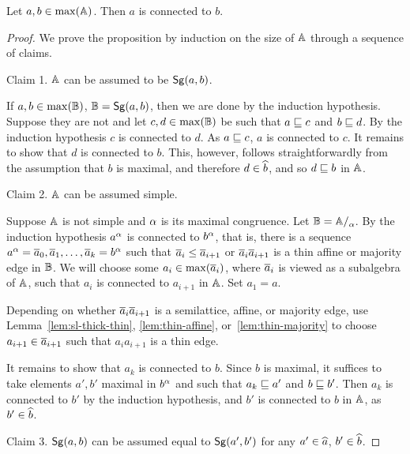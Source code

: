 \documentclass[11pt]{article}
\begin{document}
\begin{prop}\label{pro:as-connectivity}
Let $a,b\in\max({\mathbb A})$. Then $a$ is connected to $b$.
\end{prop}

\begin{proof}
We prove the proposition by induction on the size of ${\mathbb A}$ through a sequence of claims.

\smallskip

{\sc Claim 1.}
${\mathbb A}$ can be assumed to be ${\sf Sg}(a,b)$.

\smallskip

If $a,b\in\max({\mathbb B})$, ${\mathbb B}={\sf Sg}(a,b)$, then we are done by the induction hypothesis. 
Suppose they are not and let $c,d\in\max({\mathbb B})$ be such that $a\sqsubseteq c$ and $b\sqsubseteq d$. 
By the induction hypothesis $c$ is connected to $d$. 
As $a\sqsubseteq c$, $a$ is connected to $c$. It remains to show that 
$d$ is connected to $b$. This, however, follows straightforwardly from the assumption 
that $b$ is maximal, and therefore $d\in\widehat b$, and so $d\sqsubseteq b$ in ${\mathbb A}$.

\smallskip

{\sc Claim 2.}
${\mathbb A}$ can be assumed simple.

\smallskip

Suppose ${\mathbb A}$  is not simple and $\alpha$ is its maximal congruence. Let $\zB=\zA\fac\al$. By the 
induction hypothesis $a^\alpha$ is connected to $b^\alpha$, that is, there is a sequence $a^\alpha=
\overline a_0,\overline a_1,\ldots, \overline a_k=b^\alpha$ such that $\overline a_i\le\overline a_{i+1}$ or $\overline a_i\overline a_{i+1}$ is a 
thin affine or majority edge in ${\mathbb B}$. We will choose some $a_i\in\max(\overline a_i)$, where $\overline a_i$ is 
viewed as a subalgebra of ${\mathbb A}$, such that $a_i$ is connected to $a_{i+1}$ in ${\mathbb A}$. 
Set $a_1=a$.

Depending on whether $\overline a_i\overline a_{i+1}$ is a semilattice, affine, or majority edge, use 
Lemma~\ref{lem:sl-thick-thin}, \ref{lem:thin-affine}, or~\ref{lem:thin-majority} to
choose $a_{i+1}\in\overline a_{i+1}$ such that $a_ia_{i+1}$ is a thin edge.


It remains to show that $a_k$ is connected to $b$. Since $b$ is maximal, it suffices 
to take elements $a',b'$ maximal in $b^\alpha$ and such that $a_k\sqsubseteq a'$ and 
$b\sqsubseteq b'$. Then $a_k$ is connected to $b'$ by the induction hypothesis, and $b'$ 
is connected to $b$ in ${\mathbb A}$, as $b'\in\widehat b$.

\smallskip

{\sc Claim 3.}
${\sf Sg}(a,b)$ can be assumed equal to ${\sf Sg}(a',b')$ for any $a'\in\widehat a$, $b'\in\widehat b$.


\end{proof}
\end{document}
